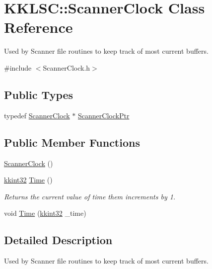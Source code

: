 \hypertarget{class_k_k_l_s_c_1_1_scanner_clock}{}\section{K\+K\+L\+SC\+:\+:Scanner\+Clock Class Reference}
\label{class_k_k_l_s_c_1_1_scanner_clock}


Used by Scanner file routines to keep track of most current buffers.  




{\ttfamily \#include $<$Scanner\+Clock.\+h$>$}

\subsection*{Public Types}
\begin{DoxyCompactItemize}
\item 
typedef \hyperlink{class_k_k_l_s_c_1_1_scanner_clock}{Scanner\+Clock} $\ast$ \hyperlink{class_k_k_l_s_c_1_1_scanner_clock_ae9f5ad56e5e47142e6759e406c55a9ea}{Scanner\+Clock\+Ptr}
\end{DoxyCompactItemize}
\subsection*{Public Member Functions}
\begin{DoxyCompactItemize}
\item 
\hyperlink{class_k_k_l_s_c_1_1_scanner_clock_ae4605aa3e27795a4202b29d686f56599}{Scanner\+Clock} ()
\item 
\hyperlink{namespace_k_k_b_a8fa4952cc84fda1de4bec1fbdd8d5b1b}{kkint32} \hyperlink{class_k_k_l_s_c_1_1_scanner_clock_a02f0579dc7f96b439f6f5b8985f5509a}{Time} ()
\begin{DoxyCompactList}\small\item\em Returns the current value of \textquotesingle{}time\textquotesingle{} them increments by 1. \end{DoxyCompactList}\item 
void \hyperlink{class_k_k_l_s_c_1_1_scanner_clock_ae6768a96ee2988552cd363827983e8c4}{Time} (\hyperlink{namespace_k_k_b_a8fa4952cc84fda1de4bec1fbdd8d5b1b}{kkint32} \+\_\+time)
\end{DoxyCompactItemize}


\subsection{Detailed Description}
Used by Scanner file routines to keep track of most current buffers. 


